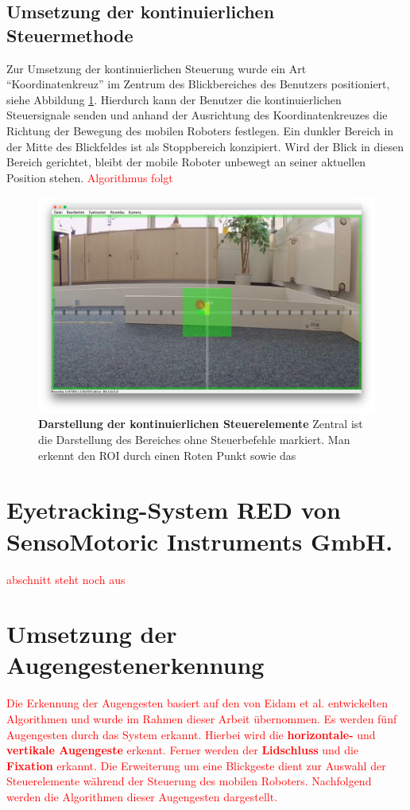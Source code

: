 \subsection{Umsetzung der kontinuierlichen Steuermethode}
\label{subsection:kontSt}
Zur Umsetzung der kontinuierlichen Steuerung wurde ein Art \enquote{Koordinatenkreuz} im Zentrum des Blickbereiches des Benutzers positioniert, siehe Abbildung \ref{fig:contMode}. Hierdurch kann der Benutzer die kontinuierlichen Steuersignale senden und anhand der Ausrichtung des Koordinatenkreuzes die Richtung der Bewegung des mobilen Roboters festlegen. Ein dunkler Bereich in der Mitte des Blickfeldes ist als Stoppbereich konzipiert. Wird der Blick in diesen Bereich gerichtet, bleibt der mobile Roboter unbewegt an seiner aktuellen Position stehen. 
\textcolor{red}{ Algorithmus folgt}
\begin{figure}[ht]
\begin{center}
\includegraphics[width=\textwidth]{bilder/implementierung/continuousMode.JPG}
\end{center}
\caption{\textbf{Darstellung der kontinuierlichen Steuerelemente} Zentral ist die Darstellung des Bereiches ohne Steuerbefehle markiert. Man erkennt den ROI durch einen Roten Punkt sowie das }
\label{fig:contMode}
\end{figure}

\section{Eyetracking-System RED von SensoMotoric Instruments GmbH.}
\textcolor{red}{ abschnitt steht noch aus}


\section{Umsetzung der Augengestenerkennung}
\label{section:augengestenerkennung}
\textcolor{red}{
Die Erkennung der Augengesten basiert auf den von Eidam et al. \vgl \cite{Eidam2016} entwickelten Algorithmen und wurde im Rahmen dieser Arbeit übernommen. }
\textcolor{red}{
Es werden fünf Augengesten durch das System erkannt. Hierbei wird die \textbf{horizontale-} und \textbf{vertikale Augengeste} erkennt. Ferner werden der \textbf{Lidschluss} und die \textbf{Fixation} erkannt. Die Erweiterung um eine Blickgeste dient zur Auswahl der Steuerelemente während der Steuerung des mobilen Roboters. Nachfolgend werden die Algorithmen dieser Augengesten dargestellt.}

